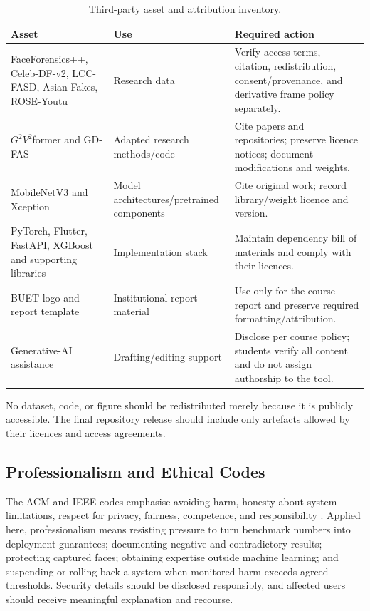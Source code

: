 \begin{table}[H]
\centering
\caption{Third-party asset and attribution inventory.}
\label{tab:ip}
\begin{tabularx}{\textwidth}{@{}p{34mm}Y Y@{}}
\toprule
Asset & Use & Required action \\
\midrule
FaceForensics++, Celeb-DF-v2, LCC-FASD, Asian-Fakes, ROSE-Youtu & Research data &
Verify access terms, citation, redistribution, consent/provenance, and derivative
frame policy separately. \\
$G^2V^2$former and GD-FAS & Adapted research methods/code & Cite papers and
repositories; preserve licence notices; document modifications and weights. \\
MobileNetV3 and Xception & Model architectures/pretrained components & Cite
original work; record library/weight licence and version. \\
PyTorch, Flutter, FastAPI, XGBoost and supporting libraries & Implementation stack &
Maintain dependency bill of materials and comply with their licences. \\
BUET logo and report template & Institutional report material & Use only for the
course report and preserve required formatting/attribution. \\
Generative-AI assistance & Drafting/editing support & Disclose per course policy;
students verify all content and do not assign authorship to the tool. \\
\bottomrule
\end{tabularx}
\end{table}

No dataset, code, or figure should be redistributed merely because it is publicly
accessible. The final repository release should include only artefacts allowed by
their licences and access agreements.

\subsection{Professionalism and Ethical Codes}

The ACM and IEEE codes emphasise avoiding harm, honesty about system limitations,
respect for privacy, fairness, competence, and responsibility
\cite{acmcode,ieeecode}. Applied here, professionalism means resisting pressure
to turn benchmark numbers into deployment guarantees; documenting negative and
contradictory results; protecting captured faces; obtaining expertise outside
machine learning; and suspending or rolling back a system when monitored harm
exceeds agreed thresholds. Security details should be disclosed responsibly, and
affected users should receive meaningful explanation and recourse.

